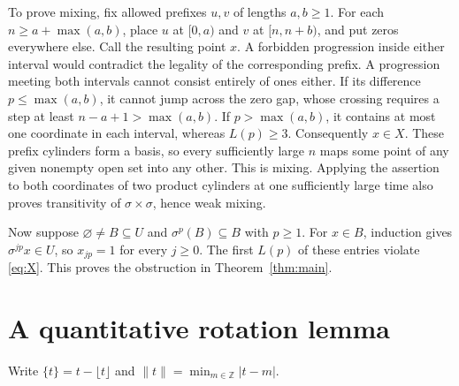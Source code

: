 \documentclass[11pt]{article}
\begin{document}
To prove mixing, fix allowed prefixes $u,v$ of lengths $a,b\geq1$.
For each $n\geq a+\max(a,b)$, place $u$ at $[0,a)$ and $v$ at
$[n,n+b)$, and put zeros everywhere else. Call the resulting point
$x$. A forbidden progression inside either interval would contradict
the legality of the corresponding prefix. A progression meeting both
intervals cannot consist entirely of ones either. If its difference
$p\leq\max(a,b)$, it cannot jump across the zero gap, whose crossing
requires a step at least $n-a+1>\max(a,b)$. If $p>\max(a,b)$, it
contains at most one coordinate in each interval, whereas $L(p)\geq3$.
Consequently $x\in X$. These prefix cylinders form a basis, so every
sufficiently large $n$ maps some point of any given nonempty open
set into any other. This is mixing. Applying the assertion to both
coordinates of two product cylinders at one sufficiently large time
also proves transitivity of $\sigma\times\sigma$, hence weak mixing.

Now suppose $\varnothing\ne B\subseteq U$ and
$\sigma^p(B)\subseteq B$ with $p\geq1$. For $x\in B$, induction gives
$\sigma^{jp}x\in U$, so $x_{jp}=1$ for every $j\geq0$.
The first $L(p)$ of these entries violate \eqref{eq:X}.
This proves the obstruction in Theorem~\ref{thm:main}.

\section{A quantitative rotation lemma}
Write $\{t\}=t-\lfloor t\rfloor$ and
$\|t\|=\min_{m\in\mathbb Z}|t-m|$.
\end{document}
